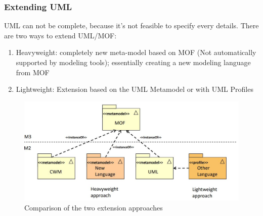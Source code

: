 			\subsubsection{Extending UML}
				UML can not be complete, because it's not feasible to specify every details. There are two ways to extend UML/MOF: 
				\begin{enumerate}
					\item Heavyweight: completely new meta-model based on MOF (Not automatically supported by modeling tools); essentially creating a new modeling language from MOF
					\item Lightweight: Extension based on the UML Metamodel or with UML Profiles
				\end{enumerate}
				\begin{figure}[h!]
					\includegraphics[scale=0.5]{res/mof-extension-methods}
					\caption{Comparison of the two extension approaches}
				\end{figure}
				
